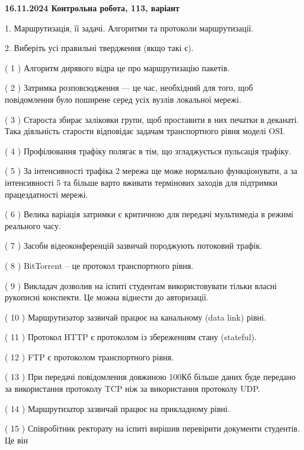 \documentclass[12pt, ukrainian]{article}
\begin{document}
\vspace{4mm}
\newpage
\begin {large}

\textbf{16.11.2024 Контрольна робота, 113, варіант  }\par


{
1. Маршрутизація, її задачі. Алгоритми та протоколи маршрутизації.



\vspace{5mm}
2. Виберіть усі правильні твердження (якщо такі є).\par
\vspace{2mm}

( 1 ) Алгоритм дирявого відра це про маршрутизацію пакетів.

( 2 ) Затримка розповсюдження — це час, необхідний для того, щоб повідомлення було поширене серед усіх вузлів локальної мережі.

( 3 ) Староста збирає заліковки групи, щоб проставити в них печатки в деканаті. Така діяльність старости відповідає задачам транспортного рівня моделі OSI.

( 4 ) Профілювання трафіку полягає в тім, що згладжується пульсація трафіку.

( 5 ) За інтенсивності трафіка 2 мережа ще може нормально функціонувати, а за інтенсивності 5 та більше варто вживати термінових заходів для підтримки працездатності мережі.

( 6 ) Велика варіація затримки є критичною для передачі мультимедіа в режимі реального часу.

( 7 ) Засоби відеоконференцій зазвичай породжують потоковий трафік.

( 8 ) BitTorrent – це протокол транспортного рівня.

( 9 ) Викладач дозволив на іспиті студентам використовувати тільки власні рукописні конспекти. Це можна віднести до авторизації.

( 10 ) Маршрутизатор зазвичай працює на канальному (data link) рівні.

( 11 ) Протокол  HTTP є протоколом із збереженням стану (stateful).

( 12 ) FTP є протоколом транспортного рівня.

( 13 ) При передачі повідомлення довжиною 100Кб більше даних буде передано за використання протоколу TCP ніж за використання протоколу UDP.

( 14 ) Маршрутизатор зазвичай працює на прикладному рівні.

( 15 ) Співробітник ректорату на іспиті вирішив перевірити документи студентів. Це він
}
\end {large}

\vspace{4mm}
\newpage
\end{document}
